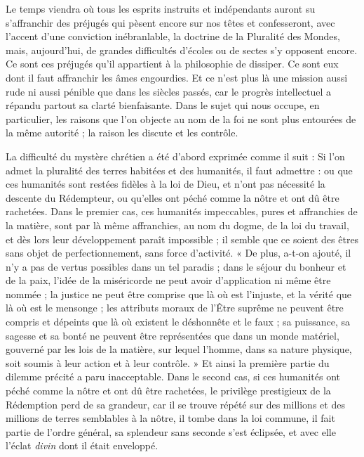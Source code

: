 \documentclass[a4paper, 11pt, oneside, landscape]{article}
\begin{document}
Le temps viendra où tous les esprits instruits et indépendants auront su s'affranchir des préjugés qui pèsent encore sur nos têtes et confesseront, avec l'accent d'une conviction inébranlable, la doctrine de la Pluralité des Mondes, mais, aujourd'hui, de grandes difficultés d'écoles ou de sectes s'y opposent encore. Ce sont ces préjugés qu'il appartient à la philosophie de dissiper. Ce sont eux dont il faut affranchir les âmes engourdies. Et ce n'est plus là une mission aussi rude ni aussi pénible que dans les siècles passés, car le progrès intellectuel a répandu partout sa clarté bienfaisante. Dans le sujet qui nous occupe, en particulier, les raisons que l'on objecte au nom de la foi ne sont plus entourées de la même autorité ; la raison les discute et les contrôle.

La difficulté du mystère chrétien a été d'abord exprimée comme il suit : Si l'on admet la pluralité des terres habitées et des humanités, il faut admettre : ou que ces humanités sont restées fidèles à la loi de Dieu, et n'ont pas nécessité la descente du Rédempteur, ou qu'elles ont péché comme la nôtre et ont dû être rachetées. Dans le premier cas, ces humanités impeccables, pures et affranchies de la matière, sont par là même affranchies, au nom du dogme, de la loi du travail, et dès lors leur développement paraît impossible ; il semble que ce soient des êtres sans objet de perfectionnement, sans force d'activité. « De plus, a-t-on ajouté, il n'y a pas de vertus possibles dans un tel paradis ; dans le séjour du bonheur et de la paix, l'idée de la miséricorde ne peut avoir d'application ni même être nommée ; la justice ne peut être comprise que là où est l'injuste, et la vérité que là où est le mensonge ; les attributs moraux de l'Être suprême ne peuvent être compris et dépeints que là où existent le déshonnête et le faux ; sa puissance, sa sagesse et sa bonté ne peuvent être représentées que dans un monde matériel, gouverné par les lois de la matière, sur lequel l'homme, dans sa nature physique, soit soumis à leur action et à leur contrôle. » Et ainsi la première partie du dilemme précité a paru inacceptable. Dans le second cas, si ces humanités ont péché comme la nôtre et ont dû être rachetées, le privilège prestigieux de la Rédemption perd de sa grandeur, car il se trouve répété sur des millions et des millions de terres semblables à la nôtre, il tombe dans la loi commune, il fait partie de l'ordre général, sa splendeur sans seconde s'est éclipsée, et avec elle l'éclat \emph{divin} dont il était enveloppé.
\end{document}
